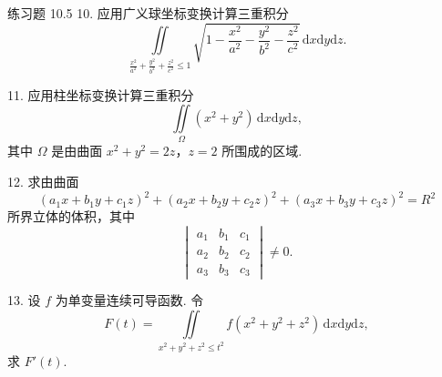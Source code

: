 \begin{exblock}{练习题 10.5}
10. 应用广义球坐标变换计算三重积分
\[
\iint \limits_{\frac{x^2}{a^2} + \frac{y^2}{b^2} + \frac{z^2}{c^2} \leqslant 1}
  \sqrt{1 - \frac{x^2}{a^2} - \frac{y^2}{b^2} - \frac{z^2}{c^2}} \, \mathrm{d}x \mathrm{d}y \mathrm{d}z.
\]

11. 应用柱坐标变换计算三重积分
\[
\iint \limits_{\Omega} (x^2 + y^2) \, \mathrm{d}x \mathrm{d}y \mathrm{d}z,
\]
其中 $\Omega$ 是由曲面 $x^2 + y^2 = 2z$，$z = 2$ 所围成的区域.

12. 求由曲面
\[
(a_1 x + b_1 y + c_1 z)^2 + (a_2 x + b_2 y + c_2 z)^2 + (a_3 x + b_3 y + c_3 z)^2 = R^2
\]
所界立体的体积，其中
\[
\begin{vmatrix}
a_1 & b_1 & c_1\\
a_2 & b_2 & c_2\\
a_3 & b_3 & c_3
\end{vmatrix} \neq 0.
\]

13. 设 $f$ 为单变量连续可导函数. 令
\[
F(t) = \iint \limits_{x^2 + y^2 + z^2 \leqslant t^2} f(x^2 + y^2 + z^2) \, \mathrm{d}x \mathrm{d}y \mathrm{d}z,
\]
求 $F'(t)$.
\end{exblock}

